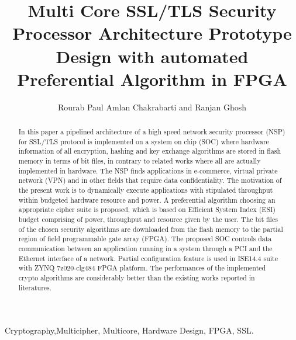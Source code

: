 \documentclass[3p,times]{elsarticle}
\begin{document}
\begin{frontmatter}



\dochead{}

\title{Multi Core SSL/TLS Security Processor Architecture  Prototype Design with automated Preferential Algorithm in FPGA}



\author{Rourab Paul 
Amlan Chakrabarti and Ranjan Ghosh
}

\address{A.K.Choudhury School of Information Technology1,5 , Dept. of Computer Science and Engineering2 and 
Institute of Radio Physics and Electronics3,4,6, 
University of Calcutta, 92 A. P. C. Road, Kolkata–700 009, India.
}

\begin{abstract}
In this paper a pipelined architecture of a high speed network security processor (NSP) for SSL/TLS protocol is implemented on a system on chip (SOC) where hardware information of all encryption, hashing and key exchange algorithms are stored in flash memory in terms of bit files, in contrary to related works where all are actually implemented in hardware. The NSP finds applications in e-commerce, virtual private network (VPN) and in other fields that require data confidentiality. The motivation of the present work is to dynamically execute applications with stipulated throughput within budgeted hardware resource and power. A preferential algorithm choosing an appropriate cipher suite is proposed, which is based on Efficient System Index (ESI) budget comprising of power, throughput and resource given by the user. The bit files of the chosen security algorithms are downloaded from the flash memory to the partial region of field programmable gate array (FPGA). The proposed SOC controls data communication between an application running in a system through a PCI and the Ethernet interface of a network. Partial configuration feature is used in ISE14.4 suite with ZYNQ 7z020-clg484 FPGA platform. The performances of the implemented crypto algorithms are considerably better than the existing works reported in literatures. 
\end{abstract}

\begin{keyword}
Cryptography,Multicipher, Multicore, Hardware Design, FPGA, SSL. 



\end{keyword}

\end{frontmatter}
\end{document}
